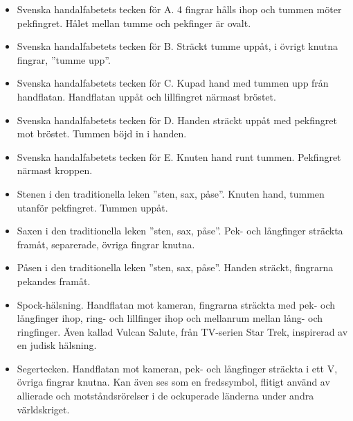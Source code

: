 \documentclass[../rapport_MVEX01-11-05]{subfiles}
\begin{document}
\begin{itemize}
 	\item Svenska handalfabetets tecken för A. 4 fingrar hålls ihop och tummen
  möter pekfingret. Hålet mellan tumme och pekfinger är ovalt.

  \item Svenska handalfabetets tecken för B. Sträckt tumme uppåt, i övrigt knutna fingrar, ''tumme upp''.

  \item Svenska handalfabetets tecken för C. Kupad hand med tummen upp från handflatan. Handflatan uppåt
  och lillfingret närmast bröstet. 

  \item Svenska handalfabetets tecken för D. Handen sträckt uppåt med pekfingret mot bröstet. Tummen böjd
  in i handen.

  \item Svenska handalfabetets tecken för E. Knuten hand runt tummen. Pekfingret närmast kroppen. 

  \item Stenen i den traditionella leken ''sten, sax, påse''. Knuten hand, tummen utanför pekfingret. Tummen uppåt.

  \item Saxen i den traditionella leken ''sten, sax, påse''. Pek- och långfinger sträckta framåt, separerade, övriga
  fingrar knutna.

  \item Påsen i den traditionella leken ''sten, sax, påse''. Handen sträckt, fingrarna pekandes framåt.

  \item Spock-hälsning. Handflatan mot kameran, fingrarna sträckta med pek- och
  långfinger ihop, ring- och lillfinger ihop och mellanrum mellan
  lång- och ringfinger. Även kallad Vulcan Salute, från TV-serien Star
  Trek, inspirerad av en judisk hälsning.

  \item Segertecken. Handflatan mot kameran, pek- och långfinger sträckta i
  ett V, övriga fingrar knutna. Kan även ses som en fredssymbol,
  flitigt använd av allierade och motståndsrörelser i de ockuperade
  länderna under andra världskriget.
\end{itemize}
\end{document}
